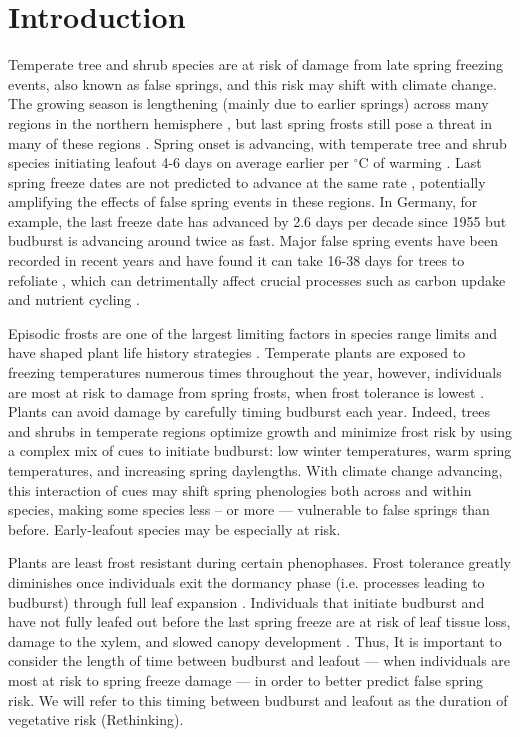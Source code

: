 \documentclass{article}\usepackage[]{graphicx}\usepackage[]{color}
\begin{document}
\section*{Introduction}
Temperate tree and shrub species are at risk of damage from late spring freezing events, also known as false springs, and this risk may shift with climate change. The growing season is lengthening (mainly due to earlier springs) across many regions in the northern hemisphere \citep{Chen2005, Liu2006, Kukal2018}, but last spring frosts still pose a threat in many of these regions \citep{Wypych2016a}. Spring onset is advancing, with temperate tree and shrub species initiating leafout 4-6 days on average earlier per $^{\circ}$C of warming \citep{Wolkovich2012, IPCC2014}. Last spring freeze dates are not predicted to advance at the same rate \citep{Inouye2008, Martin2010, Labe2016, Sgubin2018}, potentially amplifying the effects of false spring events in these regions. In Germany, for example, the last freeze date has advanced by 2.6 days per decade since 1955 \citep{Zohner2016} but budburst is advancing around twice as fast. Major false spring events have been recorded in recent years and have found it can take 16-38 days for trees to refoliate \citep{Gu2008, Augspurger2009, Augspurger2013, Menzel2015}, which can detrimentally affect crucial processes such as carbon updake and nutrient cycling \citep{Hufkens2012, Richardson2013, Klosterman2018}.

Episodic frosts are one of the largest limiting factors in species range limits and have shaped plant life history strategies \citep{Kollas2014}. Temperate plants are exposed to freezing temperatures numerous times throughout the year, however, individuals are most at risk to damage from spring frosts, when frost tolerance is lowest \citep{Sakai1987}. Plants can avoid damage by carefully timing budburst each year. Indeed, trees and shrubs in temperate regions optimize growth and minimize frost risk by using a complex mix of cues to initiate budburst: low winter temperatures, warm spring temperatures, and increasing spring daylengths. With climate change advancing, this interaction of cues may shift spring phenologies both across and within species, making some species less -- or more --- vulnerable to false springs than before. Early-leafout species may be especially at risk.
 
Plants are least frost resistant during certain phenophases. Frost tolerance greatly diminishes once individuals exit the dormancy phase (i.e. processes leading to budburst) through full leaf expansion \citep{Vitasse2014, Lenz2016}. Individuals that initiate budburst and have not fully leafed out before the last spring freeze are at risk of leaf tissue loss, damage to the xylem, and slowed canopy development \citep{Gu2008, Hufkens2012}. Thus, It is important to consider the length of time between budburst and leafout --- when individuals are most at risk to spring freeze damage \citep{Lenz2016} --- in order to better predict false spring risk. We will refer to this timing between budburst and leafout as the duration of vegetative risk (Rethinking).
\end{document}
